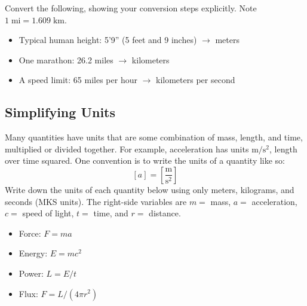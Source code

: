 \documentclass[11pt]{article}%
\newcommand*{\mt}{\mathrm}
\newcommand*{\unit}[1]{\;\mathrm{#1}}  %
\begin{document}
Convert the following, showing your conversion steps explicitly.
Note $1 \unit{mi} = 1.609 \unit{km}$.
\begin{itemize}
\item Typical human height: 5'9'' (5 feet and 9 inches) $\to$ meters
\item One marathon: 26.2 miles $\to$ kilometers
\item A speed limit: 65 miles per hour $\to$ kilometers per second
\end{itemize}

\subsection{Simplifying Units}

Many quantities have units that are some combination of mass, length, and time,
multiplied or divided together.  For example, acceleration has units
$\mathrm{m/s^{2}}$, length over time squared.
One convention is to write the units of a quantity like so:
\[
    \left[ a \right] = \mt{\left[ \frac{m}{s^2} \right]}
\]
Write down the units of each quantity below using only meters, kilograms, and
seconds (MKS units).
The right-side variables are $m =$ mass, $a =$ acceleration,
$c =$ speed of light, $t =$ time, and $r =$ distance.

\begin{itemize}%
    \item Force: $F = m a$
    \item Energy: $E = m c^2$
    \item Power: $L = E / t$
    \item Flux: $F = L / (4 \pi r^2)$
\end{itemize}
\end{document}
